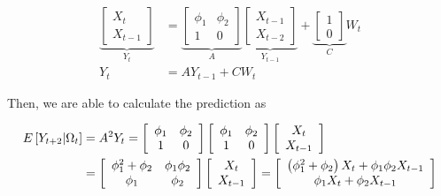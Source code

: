 \documentclass[]{book}
\theoremstyle{definition}
\theoremstyle{definition}
\theoremstyle{definition}
\theoremstyle{remark}
\begin{document}
\[\begin{aligned} \underbrace {\left[ {\begin{array}{*{20}{c}}
  {{X_t}} \\ 
  {{X_{t - 1}}} 
\end{array}} \right]}_{{Y_t}} &= \underbrace {\left[ {\begin{array}{*{20}{c}}
  {{\phi _1}}&{{\phi _2}} \\ 
  1&0 
\end{array}} \right]}_A\underbrace {\left[ {\begin{array}{*{20}{c}}
  {{X_{t - 1}}} \\ 
  {{X_{t - 2}}} 
\end{array}} \right]}_{{Y_{t - 1}}} + \underbrace {\left[ {\begin{array}{*{20}{c}}
  1 \\ 
  0 
\end{array}} \right]}_C{W_t} \\
  {Y_t} &= A{Y_{t - 1}} + C{W_t} 
\end{aligned}\]

Then, we are able to calculate the prediction as

\[\begin{aligned}
  {E}\left[ {{Y_{t + 2}}} | \Omega_t \right] &= {A^2}{Y_t} = \left[ {\begin{array}{*{20}{c}}
  {{\phi _1}}&{{\phi _2}} \\ 
  1&0 
\end{array}} \right]\left[ {\begin{array}{*{20}{c}}
  {{\phi _1}}&{{\phi _2}} \\ 
  1&0 
\end{array}} \right]\left[ {\begin{array}{*{20}{c}}
  {{X_t}} \\ 
  {{X_{t - 1}}} 
\end{array}} \right] \hfill \\
   &= \left[ {\begin{array}{*{20}{c}}
  {\phi _1^2 + {\phi _2}}&{{\phi _1}{\phi _2}} \\ 
  {{\phi _1}}&{{\phi _2}} 
\end{array}} \right]\left[ {\begin{array}{*{20}{c}}
  {{X_t}} \\ 
  {{X_{t - 1}}} 
\end{array}} \right] = \left[ {\begin{array}{*{20}{c}}
  {\left( {\phi _1^2 + {\phi _2}} \right){X_t} + {\phi _1}{\phi _2}{X_{t - 1}}} \\ 
  {{\phi _1}{X_t} + {\phi _2}{X_{t - 1}}} 
\end{array}} \right] \hfill \\ 
\end{aligned} \]
\end{document}
